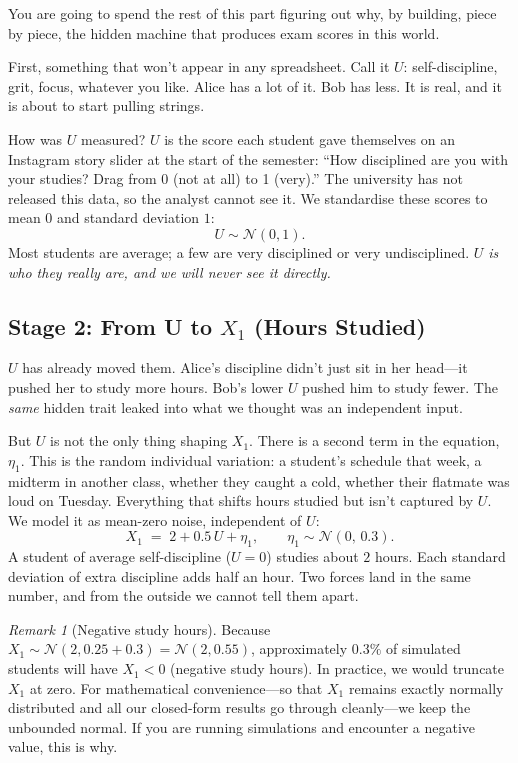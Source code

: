 \documentclass[11pt,a4paper]{article}
\theoremstyle{definition}
\theoremstyle{plain}
\theoremstyle{remark}
\newtheorem{remark}{Remark}[section]
\begin{document}
You are going to spend the rest of this part figuring out why, by building, piece by piece, the hidden machine that produces exam scores in this world.

First, something that won't appear in any spreadsheet. Call it $U$: self-discipline, grit, focus, whatever you like. Alice has a lot of it. Bob has less. It is real, and it is about to start pulling strings.

How was $U$ measured? $U$ is the score each student gave themselves on an Instagram story slider at the start of the semester: ``How disciplined are you with your studies? Drag from 0 (not at all) to 1 (very).'' The university has not released this data, so the analyst cannot see it. We standardise these scores to mean $0$ and standard deviation $1$:
\begin{equation}\label{eq:U}
  U \sim \mathcal{N}(0, 1).
\end{equation}
Most students are average; a few are very disciplined or very undisciplined. \emph{$U$ is who they really are, and we will never see it directly.}

\subsection{Stage 2: From U to $X_1$ (Hours Studied)}\label{subsec:stage-X1}

$U$ has already moved them. Alice's discipline didn't just sit in her head---it pushed her to study more hours. Bob's lower $U$ pushed him to study fewer. The \emph{same} hidden trait leaked into what we thought was an independent input.

But $U$ is not the only thing shaping $X_1$. There is a second term in the equation, $\eta_1$. This is the random individual variation: a student's schedule that week, a midterm in another class, whether they caught a cold, whether their flatmate was loud on Tuesday. Everything that shifts hours studied but isn't captured by $U$. We model it as mean-zero noise, independent of $U$:
\begin{equation}\label{eq:X1}
  X_1 \;=\; 2 + 0.5\,U + \eta_1, \qquad \eta_1 \sim \mathcal{N}(0,\, 0.3).
\end{equation}
A student of average self-discipline ($U = 0$) studies about $2$ hours. Each standard deviation of extra discipline adds half an hour. Two forces land in the same number, and from the outside we cannot tell them apart.

\begin{remark}[Negative study hours]
Because $X_1 \sim \mathcal{N}(2, 0.25 + 0.3) = \mathcal{N}(2, 0.55)$, approximately $0.3\%$ of simulated students will have $X_1 < 0$ (negative study hours). In practice, we would truncate $X_1$ at zero. For mathematical convenience---so that $X_1$ remains exactly normally distributed and all our closed-form results go through cleanly---we keep the unbounded normal. If you are running simulations and encounter a negative value, this is why.
\end{remark}
\end{document}

